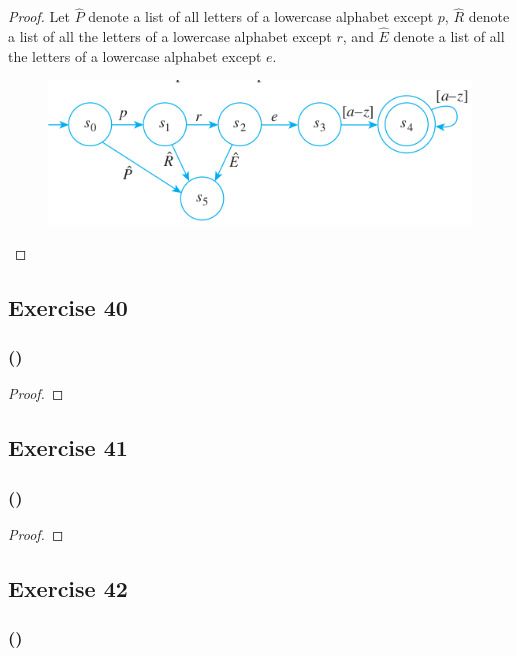\documentclass[14pt]{extarticle}
\begin{document}
\begin{proof}
Let \(\hat{P}\) denote a list of all letters of a lowercase alphabet except \(p\), \(\hat{R}\) denote a list of all the 
letters of a lowercase alphabet except \(r\), and \(\hat{E}\) denote a list of all the letters of a lowercase alphabet 
except \(e\).

\begin{figure}[ht!]
\centering
\includegraphics[scale=0.5]{../images/12.2.39.png}
\end{figure}
\end{proof}

\subsection{Exercise 40}

\subsubsection{()}

\begin{proof}

\end{proof}

\subsection{Exercise 41}

\subsubsection{()}

\begin{proof}

\end{proof}

\subsection{Exercise 42}

\subsubsection{()}
\end{document}
